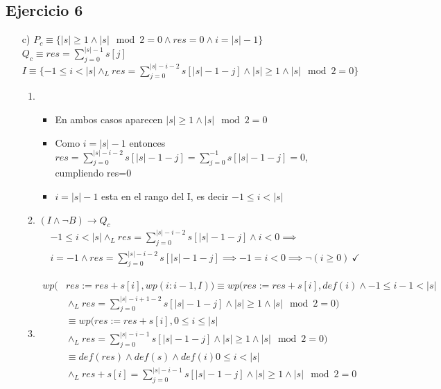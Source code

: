 \documentclass{article}
\begin{document}
\subsection*{Ejercicio 6}
\begin{itemize}
    \item [c) ] $P_c\equiv\{|s|\geq1 \land |s| \mod 2=0 \land res=0 \land i=|s|-1\}$\\
    $Q_c\equiv res=\sum\limits_{j=0}^{|s|-1}s[j]$\\
    $I\equiv\{-1\leq i<|s| \land_L res=\sum\limits_{j=0}^{|s|-i-2}s[|s|-1-j]\land |s|\geq1 \land |s|\mod2=0\}$
    \begin{enumerate}
        \item \tuno
            \begin{itemize}
                \item En ambos casos aparecen $|s|\geq1 \land |s| \mod 2 =0$
                \item Como $i=|s|-1$ entonces $res=\sum\limits_{j=0}^{|s|-i-2}s[|s|-1-j]=\sum\limits_{j=0}^{-1}s[|s|-1-j]=0$, cumpliendo res=0
                \item $i=|s|-1$ esta en el rango del I, es decir $-1\leq i<|s|$
            \end{itemize}
        \item $(I\land \neg B) \to Q_c$
        \cont\begin{align}
            &-1\leq i<|s| \land_L res=\sum\limits_{j=0}^{|s|-i-2}s[|s|-1-j]\land i<0 \implies\\
            &i=-1 \land res=\sum\limits_{j=0}^{|s|-i-2}s[|s|-1-j]\implies -1=i<0 \implies \neg (i\geq0)\ \checkmark
        \end{align}
        \item \tdos
        \cont\begin{align}
            wp(&res:=res+s[i],wp(i:i-1,I))\equiv wp(res:=res+s[i], def(i)\land -1\leq i-1<|s|\\\nonumber
            &\land_L res=\sum\limits_{j=0}^{|s|-i+1-2}s[|s|-1-j]\land |s|\geq1 \land |s|\mod2=0)\\
            &\equiv wp(res:=res+s[i], 0\leq i\leq|s|\\\nonumber
            &\land_L res=\sum\limits_{j=0}^{|s|-i-1}s[|s|-1-j]\land |s|\geq1 \land |s|\mod2=0)\\
            &\equiv def(res)\land def(s)\land def(i) 0\leq i<|s|\\\nonumber
            &\land_L res+s[i]=\sum\limits_{j=0}^{|s|-i-1}s[|s|-1-j]\land |s|\geq1 \land |s|\mod2=0\\

\end{align}
\end{enumerate}
\end{itemize}
\end{document}
